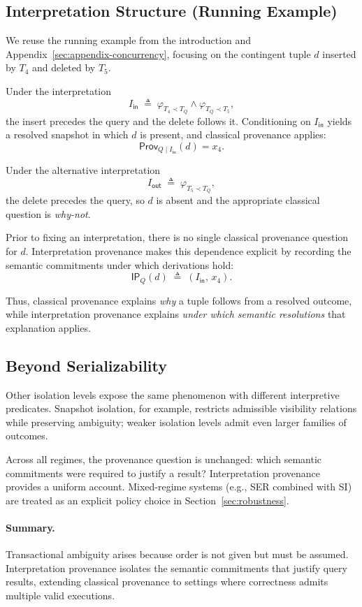 \documentclass[acmsmall,nonacm]{acmart}
\theoremstyle{remark}
\numberwithin{definition}{section}
\numberwithin{theorem}{section}
\numberwithin{lemma}{section}
\numberwithin{corollary}{section}
\numberwithin{remark}{section}
\numberwithin{example}{section}
\numberwithin{observation}{section}
\numberwithin{assumption}{section}
\newcommand{\Prov}{\mathsf{Prov}}
\begin{document}
\subsection{Interpretation Structure (Running Example)}

We reuse the running example from the introduction and
Appendix~\ref{sec:appendix-concurrency}, focusing on the contingent tuple $d$
inserted by $T_4$ and deleted by $T_5$.

Under the interpretation
\[
  I_{\mathsf{in}} \;\triangleq\;
  \varphi_{T_4 \prec T_Q} \wedge \varphi_{T_Q \prec T_5},
\]
the insert precedes the query and the delete follows it.
Conditioning on $I_{\mathsf{in}}$ yields a resolved snapshot in which $d$ is
present, and classical provenance applies:
\[
  \Prov_{Q \mid I_{\mathsf{in}}}(d)=x_4.
\]

Under the alternative interpretation
\[
  I_{\mathsf{out}} \;\triangleq\; \varphi_{T_5 \prec T_Q},
\]
the delete precedes the query, so $d$ is absent and the appropriate classical
question is \emph{why-not}.

Prior to fixing an interpretation, there is no single classical provenance
question for $d$.
Interpretation provenance makes this dependence explicit by recording the semantic
commitments under which derivations hold:
\[
  \mathsf{IP}_Q(d) \;\triangleq\; (I_{\mathsf{in}},\, x_4).
\]

Thus, classical provenance explains \emph{why} a tuple follows from a resolved
outcome, while interpretation provenance explains \emph{under which semantic
resolutions} that explanation applies.

\subsection{Beyond Serializability}

Other isolation levels expose the same phenomenon with different interpretive
predicates.
Snapshot isolation, for example, restricts admissible visibility relations while
preserving ambiguity; weaker isolation levels admit even larger families of
outcomes.

Across all regimes, the provenance question is unchanged:
which semantic commitments were required to justify a result?
Interpretation provenance provides a uniform account.
Mixed-regime systems (e.g., SER combined with SI) are treated as an explicit
policy choice in Section~\ref{sec:robustness}.

\paragraph{Summary.}
Transactional ambiguity arises because order is not given but must be assumed.
Interpretation provenance isolates the semantic commitments that justify query
results, extending classical provenance to settings where correctness admits
multiple valid executions.
\end{document}
